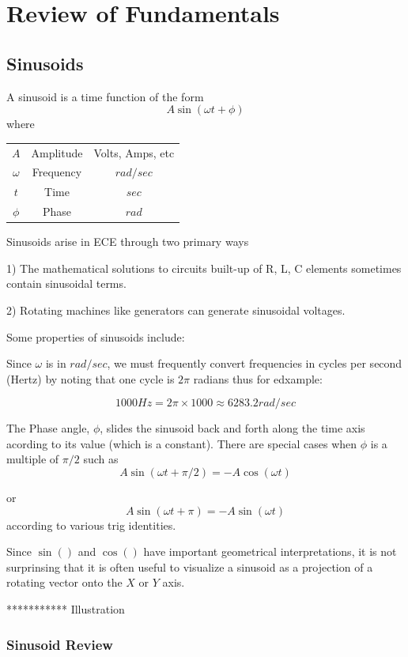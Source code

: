 \chapter{Review of Fundamentals}

\section{Sinusoids}

A sinusoid is a time function of the form
\[
  A \sin(\omega t + \phi)
\]
where

\begin{tabular}{ccc}
$A$   &  Amplitude  &  Volts, Amps, etc \\
$\omega$   & Frequency  & $rad/sec$ \\
$t$     & Time  & $sec$  \\
$\phi$  & Phase & $rad$  \\
\end{tabular}

Sinusoids arise in ECE through two primary ways

1) The mathematical solutions to circuits built-up of R, L, C elements sometimes
contain sinusoidal terms.

2) Rotating machines like generators can generate sinusoidal voltages.

Some properties of sinusoids include:

Since $\omega$ is in $rad/sec$, we must frequently convert frequencies in cycles per second (Hertz)
by noting that one cycle is $2\pi$ radians thus for edxample:

  \[
    1000 Hz = 2\pi\times 1000 \approx 6283.2 rad/sec
    \]

The Phase angle, $\phi$, slides the sinusoid back and forth along the time axis acording to its value
(which is a constant).  There are special cases when $\phi$ is a multiple of $\pi/2$ such as
\[
  A \sin(\omega t + \pi/2) = -A \cos(\omega t)
  \]

or
\[
  A \sin(\omega t + \pi) = -A \sin(\omega t)
  \]
according to various trig identities.

Since $\sin()$ and $\cos()$ have important geometrical interpretations, it is not surprinsing that it is often useful to
visualize a sinusoid as a projection of a rotating vector onto the $X$ or $Y$ axis.

***********    Illustration



\subsection*{Sinusoid Review}

